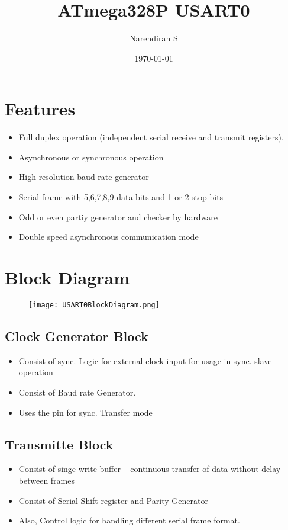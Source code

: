 \documentclass{article}
\title{ATmega328P USART0}
\author{Narendiran S}
\date{\today}
\begin{document}
\maketitle

\section{Features}
\begin{itemize}
    \item Full duplex operation (independent serial receive and transmit registers).
    \item Asynchronous or synchronous operation
    \item High resolution baud rate generator
    \item Serial frame with 5,6,7,8,9 data bits and 1 or 2 stop bits
    \item Odd or even partiy generator and checker by hardware
    \item Double speed asynchronous communication mode
\end{itemize}
\section{Block Diagram}
\begin{figure}[H]
    \centering
    \texttt{[image: USART0BlockDiagram.png]}
\end{figure}

\subsection{Clock Generator Block}
\begin{itemize}
    \item Consist of sync. Logic for external clock input for usage in sync. slave operation 
    \item Consist of Baud rate Generator.
    \item Uses the  pin for sync. Transfer mode
\end{itemize}

\subsection{Transmitte Block}
\begin{itemize}
    \item Consist of singe write buffer – continuous transfer of data without delay between frames
    \item Consist of Serial Shift register and Parity Generator
    \item Also, Control logic for handling different serial frame format.
\end{itemize}
\end{document}
